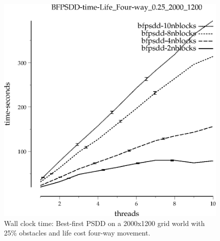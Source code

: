 \documentclass{article}
\begin{document}
\begin{figure}[t]
\begin{center}
\includegraphics{grid_life_four-way_0.25_2000_1200/BFPSDD-time-Life_Four-way_0.25_2000_1200.eps}
\caption{Wall clock time: Best-first PSDD on a 2000x1200 grid world with 25\%
  obstacles and life cost four-way movement.}
\end{center}
\end{figure}
\end{document}
